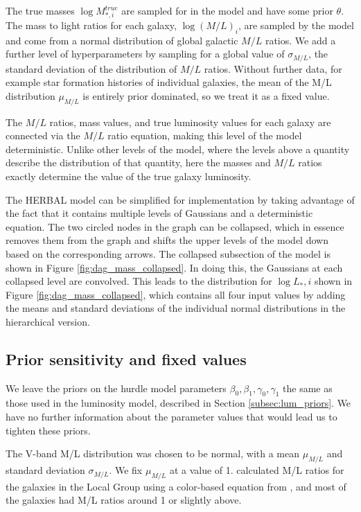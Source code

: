 \documentclass[twocolumn]{aastex631}
\begin{document}
The true masses $\log{M_{*,i}^{true}}$ are sampled for in the model and have some prior $\theta$. The mass to light ratios for each galaxy, $\log{(M/L)_i}$, are sampled by the model and come from a normal distribution of global galactic $M/L$ ratios. We add a further level of hyperparameters by sampling for a global value of $\sigma_{M/L}$, the standard deviation of the distribution of $M/L$ ratios. Without further data, for example star formation histories of individual galaxies, the mean of the M/L distribution $\mu_{M/L}$ is entirely prior dominated, so we treat it as a fixed value. 

The $M/L$ ratios, mass values, and true luminosity values for each galaxy are connected via the $M/L$ ratio equation, making this level of the model deterministic. Unlike other levels of the model, where the levels above a quantity describe the distribution of that quantity, here the masses and $M/L$ ratios exactly determine the value of the true galaxy luminosity. 

The HERBAL model can be simplified for implementation by taking advantage of the fact that it contains multiple levels of Gaussians and a deterministic equation. The two circled nodes in the graph can be collapsed, which in essence removes them from the graph and shifts the upper levels of the model down based on the corresponding arrows. The collapsed subsection of the model is shown in Figure \ref{fig:dag_mass_collapsed}. In doing this, the Gaussians at each collapsed level are convolved. This leads to the distribution for $\log{L_*,i}$ shown in Figure \ref{fig:dag_mass_collapsed}, which contains all four input values by adding the means and standard deviations of the individual normal distributions in the hierarchical version. 

\subsection{Prior sensitivity and fixed values}

We leave the priors on the hurdle model parameters $\beta_0,\beta_1,\gamma_0,\gamma_1$ the same as those used in the luminosity model, described in Section \ref{subsec:lum_priors}. We have no further information about the parameter values that would lead us to tighten these priors. 

The V-band M/L distribution was chosen to be normal, with a mean $\mu_{M/L}$ and standard deviation $\sigma_{M/L}$. We fix $\mu_{M/L}$ at a value of 1.  calculated M/L ratios for the galaxies in the Local Group using a color-based equation from \citet{Bell2003}, and most of the galaxies had M/L ratios around 1 or slightly above. 
\end{document}

